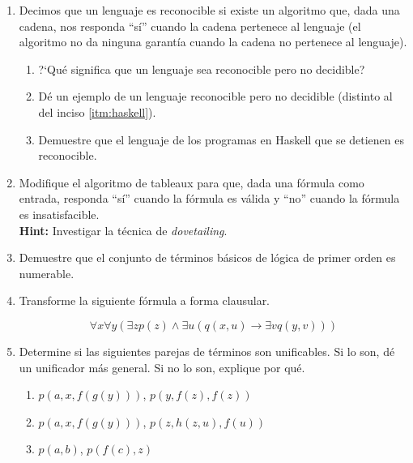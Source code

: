 \documentclass{article}
\begin{document}
\begin{enumerate}
  
\item Decimos que un lenguaje es reconocible si existe un
  algoritmo que, dada una cadena, nos responda ``s\'i'' cuando la
  cadena pertenece al lenguaje (el algoritmo no da ninguna garant\'ia cuando la
  cadena no pertenece al lenguaje).
  \begin{enumerate}
  \item ?`Qu\'e significa que un lenguaje sea reconocible pero no decidible?
  \item D\'e un ejemplo de un lenguaje reconocible pero no decidible (distinto
    al del inciso \ref{itm:haskell}).
  \item \label{itm:haskell} Demuestre que el lenguaje de los programas en Haskell que se detienen es reconocible.
  \end{enumerate}

\item Modifique el algoritmo de tableaux para que, dada una f\'ormula como
  entrada, responda ``s\'i'' cuando la f\'ormula es v\'alida y ``no'' cuando la
  f\'ormula es insatisfacible.\\
  \textbf{Hint:} Investigar la t\'ecnica de \textit{dovetailing}.

\item Demuestre que el conjunto de t\'erminos b\'asicos de l\'ogica de primer
  orden es numerable.

\item Transforme la siguiente f\'ormula a forma clausular.

  \[ \forall x \forall y (\exists z p(z) \land \exists u (q(x, u) \rightarrow
    \exists v q(y, v))) \]

\item Determine si las siguientes parejas de t\'erminos son unificables. Si lo
  son, d\'e un unificador m\'as general. Si no lo son, explique por qu\'e.

  \begin{enumerate}
  \item $p(a, x, f(g(y)))$, $p(y, f(z), f(z))$
  \item $p(a, x, f(g(y)))$, $p(z, h(z, u), f(u))$
  \item $p(a, b)$, $p(f(c), z)$
  \end{enumerate}
  
\end{enumerate}
\end{document}
